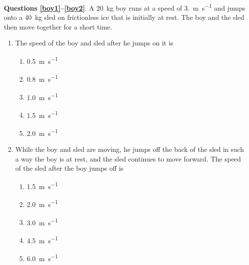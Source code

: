 \documentclass{../../../oss-apphys}
\begin{document}
\begin{multicols}{2}
\begin{enumerate}[leftmargin=18pt,resume]
  \end{enumerate}
    
  \textbf{Questions \ref{boy1}--\ref{boy2}}. A \SI{20}{\kilo\gram} boy runs at
  a speed of \SI{3.}{\metre\per\second} and jumps onto a \SI{40}{\kilo\gram}
  sled on frictionless ice that is initially at rest. The boy and the sled then
  move together for a short time.
  \begin{enumerate}[resume,leftmargin=18pt]
  \item The speed of the boy and sled after he jumps on it is
    \label{boy1}
    \begin{enumerate}[noitemsep,topsep=0pt,leftmargin=18pt,label=(\Alph*)]
    \item\SI{0.5}{\metre\per\second}
    \item\SI{0.8}{\metre\per\second}
    \item\SI{1.0}{\metre\per\second}
    \item\SI{1.5}{\metre\per\second}
    \item\SI{2.0}{\metre\per\second}
    \end{enumerate}
    
  \item While the boy and sled are moving, he jumps off the back of the sled in
    such a way the boy is at rest, and the sled continues to move forward.
    The speed of the sled after the boy jumps off is
    \label{boy2}
    \begin{enumerate}[noitemsep,topsep=0pt,leftmargin=18pt,label=(\Alph*)]
    \item\SI{1.5}{\metre\per\second}
    \item\SI{2.0}{\metre\per\second}
    \item\SI{3.0}{\metre\per\second}
    \item\SI{4.5}{\metre\per\second}
    \item\SI{6.0}{\metre\per\second}
    \end{enumerate}


\end{enumerate}
\end{multicols}
\end{document}
